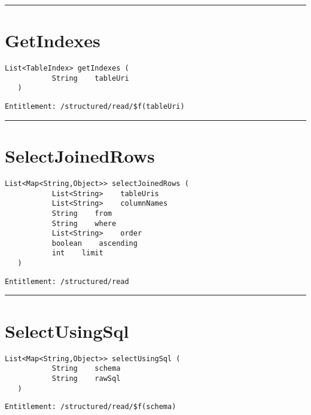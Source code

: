 \rule{12cm}{2pt}
\section{GetIndexes}
\label{Api:GetIndexes}
\begin{lstlisting}[style=nonumbers]
   List<TableIndex> getIndexes (
           String    tableUri
   )
\end{lstlisting}
\begin{Verbatim}[formatcom=\color{Maroon}]
  Entitlement: /structured/read/$f(tableUri)
\end{Verbatim}



\rule{12cm}{2pt}
\section{SelectJoinedRows}
\label{Api:SelectJoinedRows}
\begin{lstlisting}[style=nonumbers]
   List<Map<String,Object>> selectJoinedRows (
           List<String>    tableUris
           List<String>    columnNames
           String    from
           String    where
           List<String>    order
           boolean    ascending
           int    limit
   )
\end{lstlisting}
\begin{Verbatim}[formatcom=\color{Maroon}]
  Entitlement: /structured/read
\end{Verbatim}



\rule{12cm}{2pt}
\section{SelectUsingSql}
\label{Api:SelectUsingSql}
\begin{lstlisting}[style=nonumbers]
   List<Map<String,Object>> selectUsingSql (
           String    schema
           String    rawSql
   )
\end{lstlisting}
\begin{Verbatim}[formatcom=\color{Maroon}]
  Entitlement: /structured/read/$f(schema)
\end{Verbatim}



